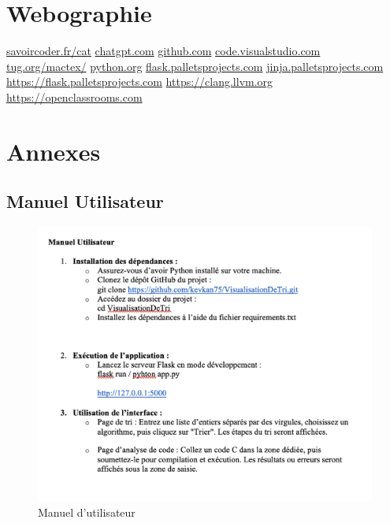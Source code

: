 \documentclass[a4paper, 12pt, twoside]{article}
\begin{document}
\section{Webographie}
\vspace{40pt}	
\begin{thebibliography}{2}
    \url{savoircoder.fr/cat}
    \url{chatgpt.com}
    \url{github.com}
    \url{code.visualstudio.com}
    \url{tug.org/mactex/}
    \url{python.org}
    \url{flask.palletsprojects.com}
    \url{jinja.palletsprojects.com}
    \url{https://flask.palletsprojects.com}
    \url{https://clang.llvm.org}
    \url{https://openclassrooms.com}
\end{thebibliography}


\newpage
\section{Annexes}
\appendix
\makeatletter
\def\@seccntformat#1{Annexe~\csname the#1\endcsname:\quad}
\makeatother

\subsection{Manuel Utilisateur}
\begin{figure}[H]
    \centering
    \includegraphics[width=\textwidth]{1.png}
    \caption{Manuel d'utilisateur}
    \label{fig:manuel1}
\end{figure}
\end{document}
